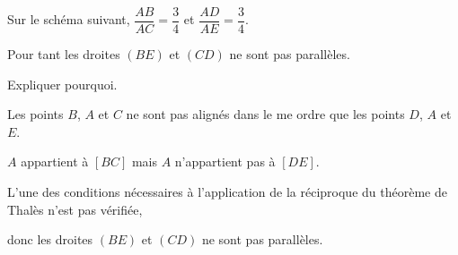 \begin{exercice*}
    Sur le schéma suivant, $\dfrac{AB}{AC}=\dfrac{3}{4}$ et $\dfrac{AD}{AE}=\dfrac{3}{4}$.

    Pour tant les droites $(BE)$ et $(CD)$ ne sont pas parallèles.


    \medskip
    Expliquer pourquoi.
\end{exercice*}
\begin{corrige}

    Les points $B$, $A$ et $C$ ne sont pas alignés dans le me ordre que les points $D$, $A$ et $E$.

    $A$ appartient à $[BC]$ mais $A$ n'appartient pas à $[DE]$.

    L'une des conditions nécessaires à l'application de la réciproque du théorème de Thalès n'est pas vérifiée,
    
    donc les droites $(BE)$ et $(CD)$ ne sont pas parallèles.
\end{corrige}

